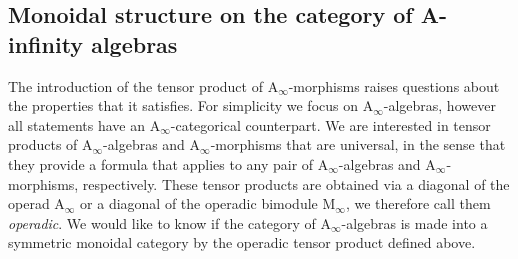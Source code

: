 \documentclass[twoside, 12pt]{amsart}
\theoremstyle{remark}
\newcommand{\Ainf}{\mathrm{A}_\infty} %
\newcommand{\Minf}{\mathrm{M}_\infty} %
\begin{document}
\subsection{Monoidal structure on the category of A-infinity algebras}
\label{sec:monoidality}
The introduction of the tensor product of $\Ainf$-morphisms raises questions about the properties that it satisfies. 
For simplicity we focus on $\Ainf$-algebras, however all statements have an $\Ainf$-categorical counterpart. 
We are interested in tensor products of $\Ainf$-algebras and $\Ainf$-morphisms that are universal, in the sense that they provide a formula that applies to any pair of $\Ainf$-algebras and $\Ainf$-morphisms, respectively. 
These tensor products are obtained via a diagonal of the operad $\Ainf$ or a diagonal of the operadic bimodule $\Minf$, we therefore call them \emph{operadic}. 
We would like to know if the category of $\Ainf$-algebras is made into a symmetric monoidal category by the operadic tensor product defined above.
\end{document}
